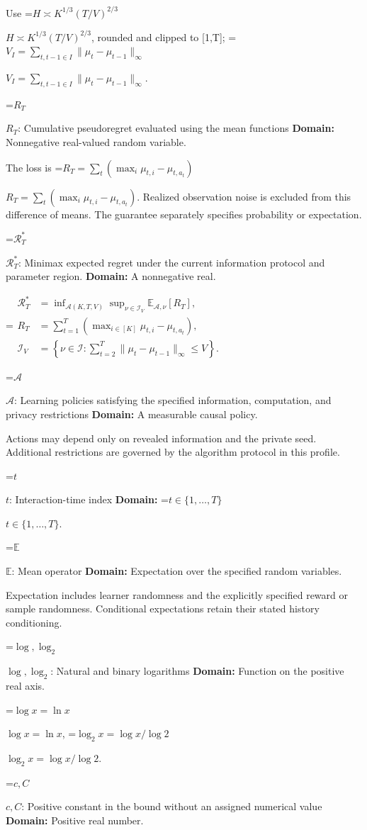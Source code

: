 \documentclass[10pt,a4paper]{article}
\newcommand{\AtlasMath}[1]{\par\begingroup\centering\setbox0=\hbox{$\displaystyle #1$}\ifdim\wd0>1.4\linewidth\typeout{ATLAS WIDE FORMULA: \the\wd0}\fi\ifdim\wd0>\linewidth\resizebox{\linewidth}{!}{\box0}\else\box0\fi\par\endgroup}
\newcommand{\AtlasInlineMath}[1]{\begingroup\setbox0=\hbox{$#1$}\ifdim\wd0>.4\linewidth\endgroup\AtlasMath{#1}\else\endgroup$#1$\fi}
\begin{document}
Use \AtlasInlineMath{H\asymp K^{1/3}(T/V)^{2/3}}, rounded and clipped to [1,T]; \AtlasInlineMath{V_I=\sum_{t,t-1\in I}\|\mu_t-\mu_{t-1}\|_\infty}.

\AtlasInlineMath{R_T}: Cumulative pseudoregret evaluated using the mean functions \textbf{Domain:} Nonnegative real-valued random variable.

The loss is \AtlasInlineMath{R_T=\sum_t(\max_i\mu_{t,i}-\mu_{t,a_t})}. Realized observation noise is excluded from this difference of means. The guarantee separately specifies probability or expectation.

\AtlasInlineMath{\mathcal R_T^*}: Minimax expected regret under the current information protocol and parameter region. \textbf{Domain:} A nonnegative real.


\AtlasMath{\begin{aligned}\mathcal R_T^*&=\inf_{\mathcal A(K,T,V)}\sup_{\nu\in\mathcal I_V}\mathbb E_{\mathcal A,\nu}[R_T],\\ R_T&=\sum_{t=1}^T(\max_{i\in[K]}\mu_{t,i}-\mu_{t,a_t}),\\ \mathcal I_V&=\left\{\nu\in\mathcal I:\sum_{t=2}^T\|\mu_t-\mu_{t-1}\|_\infty\le V\right\}.\end{aligned}}


\AtlasInlineMath{\mathcal A}: Learning policies satisfying the specified information, computation, and privacy restrictions \textbf{Domain:} A measurable causal policy.

Actions may depend only on revealed information and the private seed. Additional restrictions are governed by the algorithm protocol in this profile.

\AtlasInlineMath{t}: Interaction-time index \textbf{Domain:} \AtlasInlineMath{t\in\{1,\ldots,T\}}.

\AtlasInlineMath{\mathbb E}: Mean operator \textbf{Domain:} Expectation over the specified random variables.

Expectation includes learner randomness and the explicitly specified reward or sample randomness. Conditional expectations retain their stated history conditioning.

\AtlasInlineMath{\log,\log_2}: Natural and binary logarithms \textbf{Domain:} Function on the positive real axis.

\AtlasInlineMath{\log x=\ln x}, \AtlasInlineMath{\log_2x=\log x/\log2}.

\AtlasInlineMath{c,C}: Positive constant in the bound without an assigned numerical value \textbf{Domain:} Positive real number.
\end{document}
